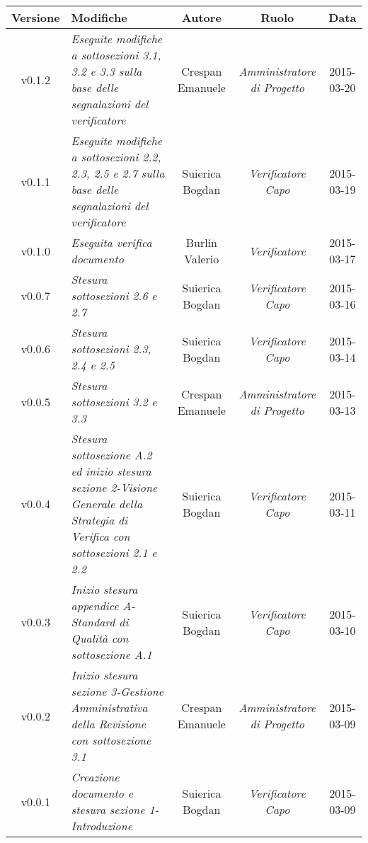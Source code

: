 \newpage

\begin{table}[h]
	\centering
	\begin{tabular}{|c|p{}|c|c|c|}
		\toprule
		\textbf{Versione} & \textbf{Modifiche} & \textbf{Autore} & \textbf{Ruolo} & \textbf{Data} \\
		\midrule
		\midrule
		v0.1.2 & \textit{Eseguite modifiche a sottosezioni 3.1, 3.2 e 3.3 sulla base delle segnalazioni del verificatore} & Crespan Emanuele & \textit{Amministratore di Progetto} & 2015-03-20\\
		\midrule
		v0.1.1 & \textit{Eseguite modifiche a sottosezioni 2.2, 2.3, 2.5 e 2.7 sulla base delle segnalazioni del verificatore} & Suierica Bogdan & \textit{Verificatore Capo} & 2015-03-19\\
		\midrule
		v0.1.0 & \textit{Eseguita verifica documento} & Burlin Valerio & \textit{Verificatore} & 2015-03-17\\
		\midrule
		v0.0.7 & \textit{Stesura sottosezioni 2.6 e 2.7} & Suierica Bogdan & \textit{Verificatore Capo} & 2015-03-16\\
		\midrule
		v0.0.6 & \textit{Stesura sottosezioni 2.3, 2.4 e 2.5} & Suierica Bogdan & \textit{Verificatore Capo} & 2015-03-14\\
		\midrule
		v0.0.5 & \textit{Stesura sottosezioni 3.2 e 3.3} & Crespan Emanuele & \textit{Amministratore di Progetto} & 2015-03-13\\
		\midrule
		v0.0.4 & \textit{Stesura sottosezione A.2 ed inizio stesura sezione 2-Visione Generale della Strategia di Verifica con sottosezioni 2.1 e 2.2} & Suierica Bogdan & \textit{Verificatore Capo} & 2015-03-11\\
		\midrule
		v0.0.3 & \textit{Inizio stesura appendice A-Standard di Qualità con sottosezione A.1} & Suierica Bogdan & \textit{Verificatore Capo} & 2015-03-10\\
		\midrule
		v0.0.2 & \textit{Inizio stesura sezione 3-Gestione Amministrativa della Revisione con sottosezione 3.1} & Crespan Emanuele & \textit{Amministratore di Progetto} & 2015-03-09\\
		\midrule
		v0.0.1 & \textit{Creazione documento e stesura sezione 1-Introduzione} & Suierica Bogdan & \textit{Verificatore Capo} & 2015-03-09\\
	\bottomrule
\end{tabular}
\end{table}

\newpage